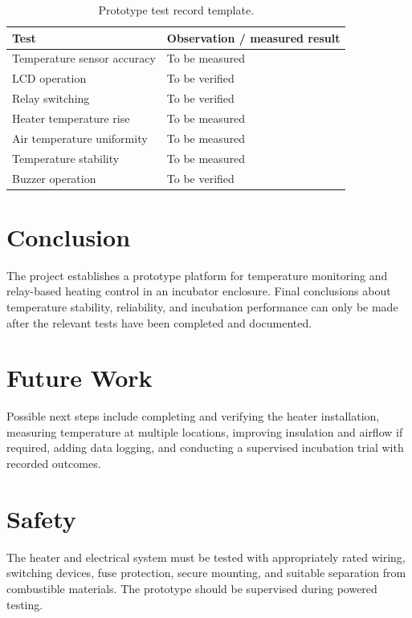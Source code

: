 \documentclass[12pt,a4paper]{report}
\begin{document}
\begin{table}[H]
\centering
\begin{tabular}{p{}p{}}
\toprule
Test & Observation / measured result \\
\midrule
Temperature sensor accuracy & To be measured \\
LCD operation & To be verified \\
Relay switching & To be verified \\
Heater temperature rise & To be measured \\
Air temperature uniformity & To be measured \\
Temperature stability & To be measured \\
Buzzer operation & To be verified \\
\bottomrule
\end{tabular}
\caption{Prototype test record template.}
\end{table}

\chapter{Conclusion}
The project establishes a prototype platform for temperature monitoring and relay-based heating control in an incubator enclosure. Final conclusions about temperature stability, reliability, and incubation performance can only be made after the relevant tests have been completed and documented.

\chapter{Future Work}
Possible next steps include completing and verifying the heater installation, measuring temperature at multiple locations, improving insulation and airflow if required, adding data logging, and conducting a supervised incubation trial with recorded outcomes.

\chapter{Safety}
The heater and electrical system must be tested with appropriately rated wiring, switching devices, fuse protection, secure mounting, and suitable separation from combustible materials. The prototype should be supervised during powered testing.
\end{document}
